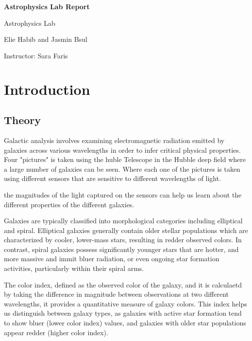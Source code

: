 \documentclass[11pt,a4paper]{article}
\newcommand{\reporttitle}{Astrophysics Lab Report}
\newcommand{\authorname}{Elie Habib and Jasmin Bsul}
\newcommand{\instructor}{Sara Faris}
\newcommand{\coursename}{Astrophysics Lab}
\begin{document}
\begin{titlepage}
  \centering
  \vspace*{1cm}
  {\Huge\bfseries \reporttitle \par}
  \vspace{1.5cm}
  {\Large\coursename \par}
  \vspace{2cm}
  {\Large\authorname \par}
  \vfill
  Instructor: \instructor\par
\end{titlepage}

\cleardoublepage
{}
\tableofcontents
\cleardoublepage
{}

\section{Introduction}
\subsection{Theory}
Galactic analysis involves examining electromagnetic radiation emitted by galaxies across various wavelengths in order to infer critical physical properties. 
Four "pictures" is taken using the huble Telescope in  the Hubble deep field where a large number of galaxies can be seen. Where each one of the pictures is taken using different sensors that are sensitive to different wavelengths of light. 

the magnitudes of the light captured on the sensors can help us learn about the different properties of the different galaxies. 


Galaxies are typically classified into morphological categories including elliptical and spiral. Elliptical galaxies generally contain older stellar populations which are characterized by cooler, lower-mass stars, resulting in redder observed colors. In contrast, spiral galaxies possess significantly younger stars that are hotter, and more massive and immit bluer radiation, or even ongoing star formation activities, particularly within their spiral arms.

The color index, defined as the observed color of the galaxy, and it is calculaetd by taking the difference in magnitude between observations at two different wavelengths,  it provides a quantitative measure of galaxy colors. This index helps us distinguish between galaxy types, as galaxies with active star formation tend to show bluer (lower color index) values, and galaxies with older star populations appear redder (higher color index).
\end{document}
